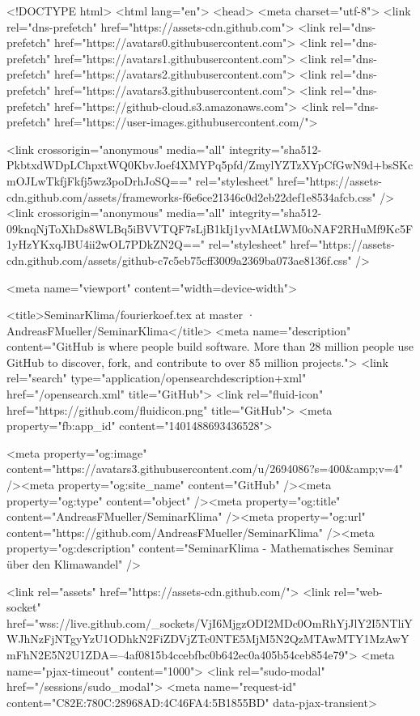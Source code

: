 





<!DOCTYPE html>
<html lang="en">
  <head>
    <meta charset="utf-8">
  <link rel="dns-prefetch" href="https://assets-cdn.github.com">
  <link rel="dns-prefetch" href="https://avatars0.githubusercontent.com">
  <link rel="dns-prefetch" href="https://avatars1.githubusercontent.com">
  <link rel="dns-prefetch" href="https://avatars2.githubusercontent.com">
  <link rel="dns-prefetch" href="https://avatars3.githubusercontent.com">
  <link rel="dns-prefetch" href="https://github-cloud.s3.amazonaws.com">
  <link rel="dns-prefetch" href="https://user-images.githubusercontent.com/">



  <link crossorigin="anonymous" media="all" integrity="sha512-PkbtxdWDpLChpxtWQ0KbvJoef4XMYPq5pfd/ZmylYZTzXYpCfGwN9d+bsSKcmOJLwTkfjFkfj5wz3poDrhJoSQ==" rel="stylesheet" href="https://assets-cdn.github.com/assets/frameworks-f6e6ce21346c0d2eb22def1e8534afcb.css" />
  <link crossorigin="anonymous" media="all" integrity="sha512-09knqNjToXhDs8WLBq5iBVVTQF7sLjB1kIj1yvMAtLWM0oNAF2RHuMf9Kc5F1yHzYKxqJBU4ii2wOL7PDkZN2Q==" rel="stylesheet" href="https://assets-cdn.github.com/assets/github-c7c5eb75cff3009a2369ba073ae8136f.css" />
  
  
  
  

  <meta name="viewport" content="width=device-width">
  
  <title>SeminarKlima/fourierkoef.tex at master · AndreasFMueller/SeminarKlima</title>
    <meta name="description" content="GitHub is where people build software. More than 28 million people use GitHub to discover, fork, and contribute to over 85 million projects.">
    <link rel="search" type="application/opensearchdescription+xml" href="/opensearch.xml" title="GitHub">
  <link rel="fluid-icon" href="https://github.com/fluidicon.png" title="GitHub">
  <meta property="fb:app_id" content="1401488693436528">

    
    <meta property="og:image" content="https://avatars3.githubusercontent.com/u/2694086?s=400&amp;v=4" /><meta property="og:site_name" content="GitHub" /><meta property="og:type" content="object" /><meta property="og:title" content="AndreasFMueller/SeminarKlima" /><meta property="og:url" content="https://github.com/AndreasFMueller/SeminarKlima" /><meta property="og:description" content="SeminarKlima - Mathematisches Seminar über den Klimawandel" />

  <link rel="assets" href="https://assets-cdn.github.com/">
  <link rel="web-socket" href="wss://live.github.com/_sockets/VjI6MjgzODI2MDc0OmRhYjJlY2I5NTliYWJhNzFjNTgyYzU1ODhkN2FiZDVjZTc0NTE5MjM5N2QzMTAwMTY1MzAwYmFhN2E5N2U1ZDA=--4af0815b4ccebfbc0b642ec0a405b54ceb854e79">
  <meta name="pjax-timeout" content="1000">
  <link rel="sudo-modal" href="/sessions/sudo_modal">
  <meta name="request-id" content="C82E:780C:28968AD:4C46FA4:5B1855BD" data-pjax-transient>


